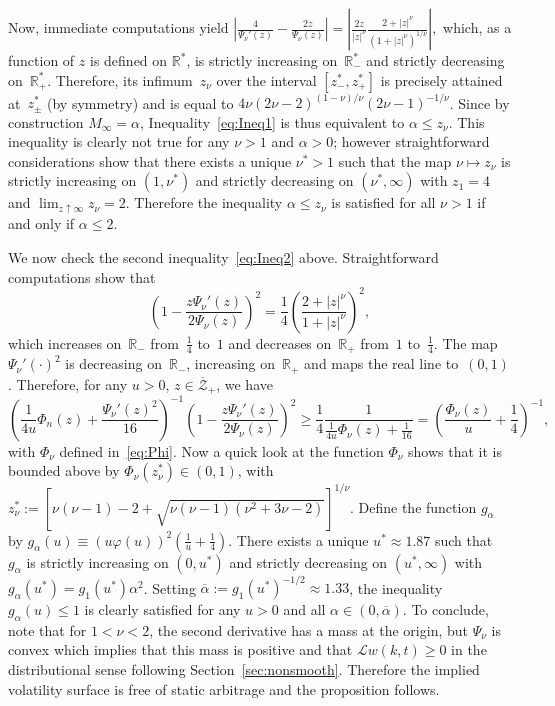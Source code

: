 \documentclass{amsart}[11pt]
\numberwithin{equation}{section}
\theoremstyle{definition}
\newcommand{\RR}{\mathbb{R}}
\newcommand{\Ll}{\mathcal{L}}
\newcommand{\Zz}{\mathcal{Z}}
\begin{document}
Now, immediate computations yield
$\displaystyle
\left|\frac{4}{\Psi_\nu'(z)}-\frac{2z}{\Psi_\nu(z)}\right|
= \left|\frac{2z}{|z|^\nu}\frac{2+|z|^\nu}{\left(1+|z|^\nu\right)^{1/\nu}}\right|,
$
which, as a function of $z$ is defined on $\RR^*$, is strictly increasing on~$\RR_-^*$ 
and strictly decreasing on~$\RR_+^*$.
Therefore, its infimum~$z_\nu$ over the interval $[z_-^*,z_+^*]$ is precisely attained at~$z_\pm^*$ 
(by symmetry) and is equal to
$4\nu(2\nu-2)^{(1-\nu)/\nu}(2\nu-1)^{-1/\nu}$.
Since by construction $M_\infty=\alpha$, Inequality~\eqref{eq:Ineq1} is thus equivalent to $\alpha \leq z_\nu$.
This inequality is clearly not true for any $\nu>1$ and $\alpha>0$;
however straightforward considerations show that there exists a unique $\nu^*>1$ 
such that the map $\nu\mapsto z_\nu$ is strictly increasing on $(1,\nu^*)$ 
and strictly decreasing on $(\nu^*,\infty)$ with $z_1=4$ and $\lim_{z\uparrow \infty} z_\nu = 2$.
Therefore the inequality $\alpha \leq z_\nu$ is satisfied for all $\nu>1$ if and only if $\alpha\leq 2$.

We now check the second inequality~\eqref{eq:Ineq2} above.
Straightforward computations show that
$$
\left(1-\frac{z\Psi_\nu'(z)}{2\Psi_\nu(z)}\right)^2
 = \frac{1}{4}\left(\frac{2+|z|^\nu}{1+|z|^\nu}\right)^2,
$$
which increases on~$\RR_-$ from~$\frac{1}{4}$ to~$1$ 
and decreases on~$\RR_+$ from~$1$ to~$\frac{1}{4}$.
The map $\Psi_\nu'(\cdot)^{2}$ is decreasing on~$\RR_-$, increasing on~$\RR_+$ 
and maps the real line to~$(0,1)$.
Therefore, for any $u>0$, $z \in \overline{\Zz}_+$, we have
$$
\left(\frac{1}{4 u}\Phi_n(z)+\frac{\Psi_\nu'(z)^{2}}{16}\right)^{-1}
\left(1-\frac{z\Psi_\nu'(z)}{2\Psi_\nu(z)}\right)^2
\geq 
\frac{1}{4}\frac{1}{\frac{1}{4 u}\Phi_\nu(z)+\frac{1}{16}}
= \left(\frac{\Phi_\nu(z)}{u}+\frac{1}{4}\right)^{-1},
$$
with $\Phi_\nu$ defined in~\eqref{eq:Phi}.
Now a quick look at the function $\Phi_\nu$ shows that 
it is bounded above by $\Phi_\nu(z_\nu^*) \in (0,1)$, 
with $z_\nu^*:=[\nu(\nu-1)-2+\sqrt{\nu(\nu-1)(\nu^2+3\nu-2)}]^{1/\nu}$.
Define the function $g_\alpha$ by
$g_\alpha(u)\equiv (u\varphi(u))^2 \left(\frac{1}{u}+\frac{1}{4}\right)$.
There exists a unique $u^*\approx 1.87$ such that~$g_\alpha$ is strictly increasing
on $(0,u^*)$ and strictly decreasing on $(u^*,\infty)$ with $g_\alpha(u^*) = g_1(u^*)\alpha^2$.
Setting $\overline{\alpha}:=g_1(u^*)^{-1/2}\approx 1.33$, the inequality $g_\alpha(u)\leq 1$
is clearly satisfied for any $u>0$ and all $\alpha \in (0,\overline{\alpha})$.
To conclude, note that for $1<\nu<2$, the second derivative has a mass at the origin, 
but $\Psi_\nu$ is convex which implies that this mass is positive and 
that $\Ll w(k,t)\geq0$ in the distributional sense following Section~\ref{sec:nonsmooth}.
Therefore the implied volatility surface is free of static arbitrage and the proposition follows.
\end{document}
